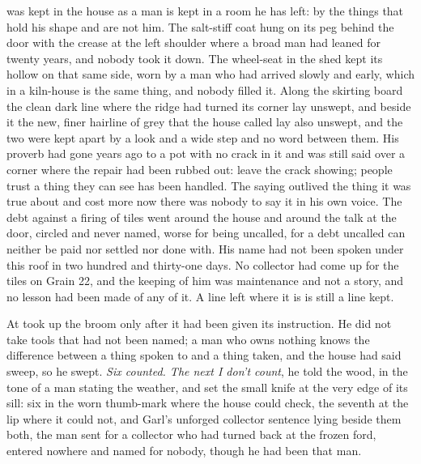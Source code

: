  was kept in the house as a man is kept in a room he has left: by the things that hold his shape and are not him. The salt-stiff coat hung on its peg behind the door with the crease at the left shoulder where a broad man had leaned for twenty years, and nobody took it down. The wheel-seat in the shed kept its hollow on that same side, worn by a man who had arrived slowly and early, which in a kiln-house is the same thing, and nobody filled it. Along the skirting board the clean dark line where the  ridge had turned its corner lay unswept, and beside it the new, finer hairline of grey that the house called  lay also unswept, and the two were kept apart by a look and a wide step and no word between them. His proverb had gone years ago to a pot with no crack in it and was still said over a corner where the repair had been rubbed out: leave the crack showing; people trust a thing they can see has been handled. The saying outlived the thing it was true about and cost more now there was nobody to say it in his own voice. The debt against a firing of tiles went around the house and around the talk at the door, circled and never named, worse for being uncalled, for a debt uncalled can neither be paid nor settled nor done with. His name had not been spoken under this roof in two hundred and thirty-one days. No collector had come up  for the tiles on Grain 22, and the keeping of him was maintenance and not a story, and no lesson had been made of any of it. A line left where it is is still a line kept.

\scenebreak

At   took up the broom only after it had been given its instruction. He did not take tools that had not been named; a man who owns nothing knows the difference between a thing spoken to and a thing taken, and the house had said sweep, so he swept. \emph{Six counted. The next I don't count}, he told the wood, in the tone of a man stating the weather, and set the small knife at the very edge of its sill: six in the worn thumb-mark where the house could check, the seventh at the lip where it could not, and Garl's unforged collector sentence lying beside them both, the man sent for a collector who had turned back at the frozen ford, entered nowhere and named for nobody, though he had been that man.

